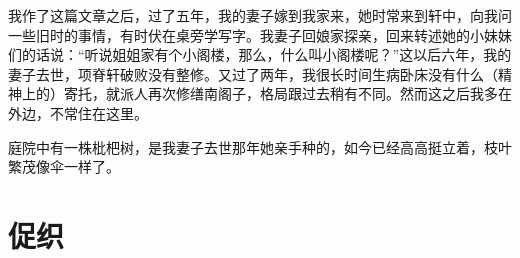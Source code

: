 \documentclass[12pt,UTF-8,openany,a4]{ctexbook}
\begin{document}
\begin{large}
    我作了这篇文章之后，过了五年，我的妻子嫁到我家来，她时常来到轩中，向我问一些旧时的事情，有时伏在桌旁学写字。我妻子回娘家探亲，回来转述她的小妹妹们的话说：“听说姐姐家有个小阁楼，那么，什么叫小阁楼呢？”这以后六年，我的妻子去世，项脊轩破败没有整修。又过了两年，我很长时间生病卧床没有什么（精神上的）寄托，就派人再次修缮南阁子，格局跟过去稍有不同。然而这之后我多在外边，不常住在这里。
    
    庭院中有一株枇杷树，是我妻子去世那年她亲手种的，如今已经高高挺立着，枝叶繁茂像伞一样了。
    
\end{large}



\chapter{促织}
\end{document}
